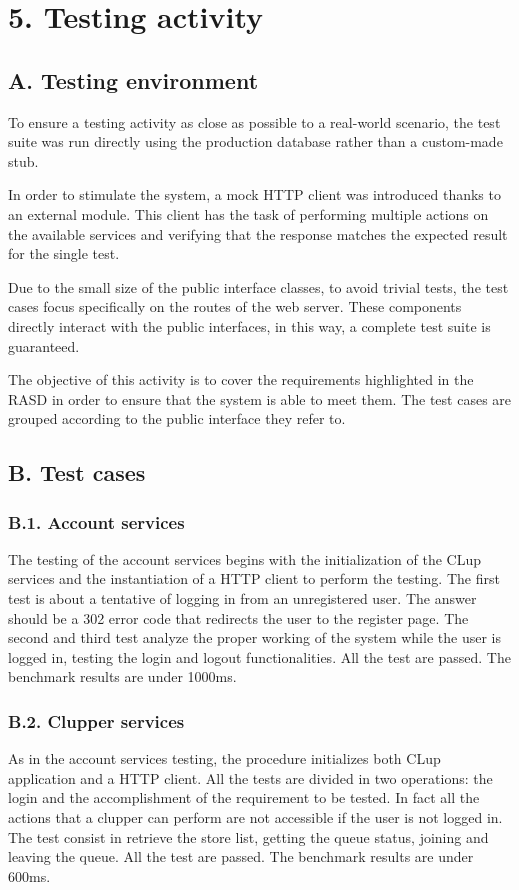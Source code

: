 \chapter{5. Testing activity}

\section{A. Testing environment}

To ensure a testing activity as close as possible to a real-world scenario, the test suite was run directly using the production database rather than a custom-made stub.

In order to stimulate the system, a mock HTTP client was introduced thanks to an external module.
This client has the task of performing multiple actions on the available services and verifying that the response matches the expected result for the single test.

Due to the small size of the public interface classes, to avoid trivial tests, the test cases focus specifically on the routes of the web server.
These components directly interact with the public interfaces, in this way, a complete test suite is guaranteed.

The objective of this activity is to cover the requirements highlighted in the RASD in order to ensure that the system is able to meet them.
The test cases are grouped according to the public interface they refer to.

\section{B. Test cases}

\subsection{B.1. Account services}
The testing of the account services begins with the initialization of the CLup services and the instantiation of a HTTP client to perform the testing.
The first test is about a tentative of logging in from an unregistered user. The answer should be a 302 error code that redirects the user to the register page.
The second and third test analyze the proper working of the system while the user is logged in, testing the login and logout functionalities.
All the test are passed. The benchmark results are under 1000ms.

\subsection{B.2. Clupper services}
As in the account services testing, the procedure initializes both CLup application and a HTTP client.
All the tests are divided in two operations: the login and the accomplishment of the requirement to be tested.
In fact all the actions that a clupper can perform are not accessible if the user is not logged in.
The test consist in retrieve the store list, getting the queue status, joining and leaving the queue.
All the test are passed. The benchmark results are under 600ms.

